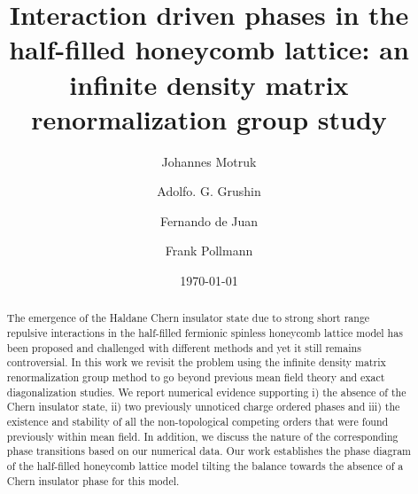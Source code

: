 \documentclass[aps,prx,10pt,twocolumn,floatfix,superscriptaddress,showpacs,numerical,footinbib]{revtex4-1}
\begin{document}
%
\title{Interaction driven phases in the half-filled honeycomb lattice: an infinite density matrix renormalization group study}
%
\author{Johannes Motruk}
\author{Adolfo. G. Grushin}
\author{Fernando de Juan}
\author{Frank Pollmann}
%
\date{\today}
%
\begin{abstract}
%
%
The emergence of the Haldane Chern insulator state due to strong short range repulsive interactions in the half-filled fermionic spinless honeycomb lattice
model has been proposed and challenged with different methods and yet it still remains controversial.
%
In this work we revisit the problem using the infinite density matrix renormalization group method to go beyond previous mean field theory and exact
diagonalization studies.
%
We report numerical evidence supporting 
i) the absence of the Chern insulator state, 
ii) two previously unnoticed charge ordered phases
and iii) the existence and stability of all the non-topological competing orders that were found previously within mean field.
%
In addition, we discuss the nature of the corresponding phase transitions based on our numerical data.
%
Our work establishes the phase diagram of the half-filled honeycomb lattice model tilting the balance
towards the absence of a Chern insulator phase for this model.
%
\end{abstract}
%
\maketitle
%
\end{document}
